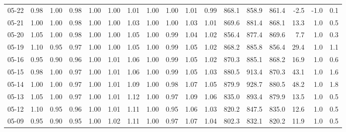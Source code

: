 \begin{threeparttable}
{\begin{tabular}{lrrrrrrrrrrrrrrrr}
  05-22 &   0.98 &   1.00 &         0.98 &     1.00 &           1.00 &        1.01 &        1.00 &        1.00 &          1.01 &          0.99 & 868.1 & 858.9 & 861.4 &       -2.5 &                     -1.0 &                 0.1 \\
  05-21 &   1.00 &   1.00 &         0.98 &     1.00 &           1.00 &        1.03 &        1.00 &        1.00 &          1.03 &          1.01 & 869.6 & 881.4 & 868.1 &       13.3 &                      1.0 &                 0.5 \\
  05-20 &   1.05 &   1.00 &         0.98 &     1.00 &           1.00 &        1.05 &        1.00 &        0.99 &          1.04 &          1.02 & 856.4 & 877.4 & 869.6 &        7.7 &                      1.0 &                 0.3 \\
  05-19 &   1.10 &   0.95 &         0.97 &     1.00 &           1.00 &        1.05 &        1.00 &        0.99 &          1.05 &          1.02 & 868.2 & 885.8 & 856.4 &       29.4 &                      1.0 &                 1.1 \\
  05-16 &   0.95 &   0.90 &         0.96 &     1.00 &           1.01 &        1.06 &        1.00 &        0.99 &          1.05 &          1.02 & 870.3 & 885.1 & 868.2 &       16.9 &                      1.0 &                 0.6 \\
  05-15 &   0.98 &   1.00 &         0.97 &     1.00 &           1.01 &        1.06 &        1.00 &        0.99 &          1.05 &          1.03 & 880.5 & 913.4 & 870.3 &       43.1 &                      1.0 &                 1.6 \\
  05-14 &   1.00 &   1.00 &         0.97 &     1.00 &           1.01 &        1.09 &        1.00 &        0.98 &          1.07 &          1.05 & 879.9 & 928.7 & 880.5 &       48.2 &                      1.0 &                 1.8 \\
  05-13 &   1.05 &   1.00 &         0.97 &     1.00 &           1.01 &        1.12 &        1.00 &        0.97 &          1.09 &          1.06 & 835.0 & 893.4 & 879.9 &       13.5 &                      1.0 &                 0.5 \\
  05-12 &   1.10 &   0.95 &         0.96 &     1.00 &           1.01 &        1.11 &        1.00 &        0.95 &          1.06 &          1.03 & 820.2 & 847.5 & 835.0 &       12.6 &                      1.0 &                 0.5 \\
  05-09 &   0.95 &   0.90 &         0.95 &     1.00 &           1.02 &        1.11 &        1.00 &        0.97 &          1.07 &          1.04 & 802.3 & 832.1 & 820.2 &       11.9 &                      1.0 &                 0.5 \\

\end{tabular}}
\end{threeparttable}
